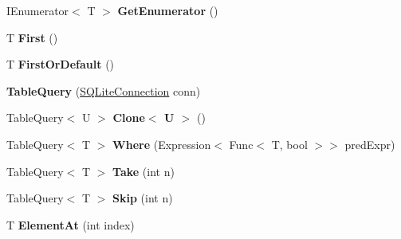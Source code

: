 \begin{DoxyCompactItemize}
\item 
\hypertarget{classSQLite_1_1TableQuery_3_01T_01_4_a3929d540dd0a888291077626d4690202}{I\-Enumerator$<$ T $>$ {\bfseries Get\-Enumerator} ()}\label{classSQLite_1_1TableQuery_3_01T_01_4_a3929d540dd0a888291077626d4690202}

\item 
\hypertarget{classSQLite_1_1TableQuery_3_01T_01_4_a5d9bc1e1c29e1da74671e17033f2badb}{T {\bfseries First} ()}\label{classSQLite_1_1TableQuery_3_01T_01_4_a5d9bc1e1c29e1da74671e17033f2badb}

\item 
\hypertarget{classSQLite_1_1TableQuery_3_01T_01_4_a517c2275d7bd055d07f0b810cb8ae179}{T {\bfseries First\-Or\-Default} ()}\label{classSQLite_1_1TableQuery_3_01T_01_4_a517c2275d7bd055d07f0b810cb8ae179}

\item 
\hypertarget{classSQLite_1_1TableQuery_3_01T_01_4_a2e3874f45af10a8c44db821c7a848aab}{{\bfseries Table\-Query} (\hyperlink{classSQLite_1_1SQLiteConnection}{S\-Q\-Lite\-Connection} conn)}\label{classSQLite_1_1TableQuery_3_01T_01_4_a2e3874f45af10a8c44db821c7a848aab}

\item 
\hypertarget{classSQLite_1_1TableQuery_3_01T_01_4_a744de6c9fda8bf39de015ae41c0b2cb3}{Table\-Query$<$ U $>$ {\bfseries Clone$<$ U $>$} ()}\label{classSQLite_1_1TableQuery_3_01T_01_4_a744de6c9fda8bf39de015ae41c0b2cb3}

\item 
\hypertarget{classSQLite_1_1TableQuery_3_01T_01_4_aafcda8a0d85fc7708bc29cc1ae254be5}{Table\-Query$<$ T $>$ {\bfseries Where} (Expression$<$ Func$<$ T, bool $>$$>$ pred\-Expr)}\label{classSQLite_1_1TableQuery_3_01T_01_4_aafcda8a0d85fc7708bc29cc1ae254be5}

\item 
\hypertarget{classSQLite_1_1TableQuery_3_01T_01_4_abc1454c5581e01ee57873a8c59101d5c}{Table\-Query$<$ T $>$ {\bfseries Take} (int n)}\label{classSQLite_1_1TableQuery_3_01T_01_4_abc1454c5581e01ee57873a8c59101d5c}

\item 
\hypertarget{classSQLite_1_1TableQuery_3_01T_01_4_a4bf49d4c603ea8a6db6d65e51bdd6458}{Table\-Query$<$ T $>$ {\bfseries Skip} (int n)}\label{classSQLite_1_1TableQuery_3_01T_01_4_a4bf49d4c603ea8a6db6d65e51bdd6458}

\item 
\hypertarget{classSQLite_1_1TableQuery_3_01T_01_4_a1adf19dc2456239c4b4a900995b2794d}{T {\bfseries Element\-At} (int index)}\label{classSQLite_1_1TableQuery_3_01T_01_4_a1adf19dc2456239c4b4a900995b2794d}


\end{DoxyCompactItemize}
